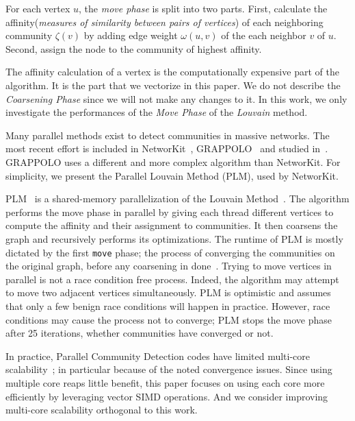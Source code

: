 \documentclass[default,iicol]{sn-jnl}%
\theoremstyle{thmstyleone}%
\theoremstyle{thmstyletwo}%
\theoremstyle{thmstylethree}%
\begin{document}
For each vertex $u$, the \textit{move phase} is split into two parts. First, calculate the affinity(\textit{measures of similarity between pairs of vertices}) of each neighboring community $\zeta(v)$ by adding edge weight $\omega(u,v)$
of the each neighbor $v$ of $u$. Second, assign the node to the community of highest affinity.


The affinity calculation of a vertex is the computationally expensive part of the algorithm. It is the part that we vectorize in this paper.
We do not describe the \textit{Coarsening Phase} since we will not
make any changes to it. 
In this work, we only investigate the performances of the \textit{Move Phase} of the \textit{Louvain} method.

Many parallel methods exist to detect communities in massive networks.
The most recent effort is included in
NetworKit~\cite{staudt2014networkit}, GRAPPOLO~\cite{lu2015parallel}
and studied in~\cite{plm, halappanavar2017scalable}. GRAPPOLO uses a
different and more complex algorithm than NetworKit. For simplicity,
we present the Parallel Louvain Method (PLM), used by
NetworKit. 

PLM~\cite{plm}  is a shared-memory parallelization of the Louvain Method~\cite{Vincent}. The algorithm performs 
the move phase in parallel by giving each thread different vertices to compute the affinity and their assignment to 
communities. It then coarsens the graph and recursively performs its optimizations. The runtime of 
PLM is mostly dictated by the first \texttt{move} phase; the process of converging the communities on the 
original graph, before any coarsening in done~\cite{plm}. Trying to 
move vertices in parallel is not a race condition free process. Indeed, the algorithm may attempt to move two adjacent 
vertices simultaneously. PLM is optimistic and assumes that only a few benign race 
conditions will happen in practice. However, race conditions may cause the process not to converge; PLM stops the move phase after 25 iterations, whether communities have converged or not.

In practice, Parallel Community Detection codes have limited
multi-core scalability~\cite{plm}; in particular because of the noted
convergence issues.  Since using multiple core reaps little benefit,
this paper focuses on using each core more efficiently by leveraging
vector SIMD operations. And we consider improving multi-core
scalability orthogonal to this work.
\end{document}

